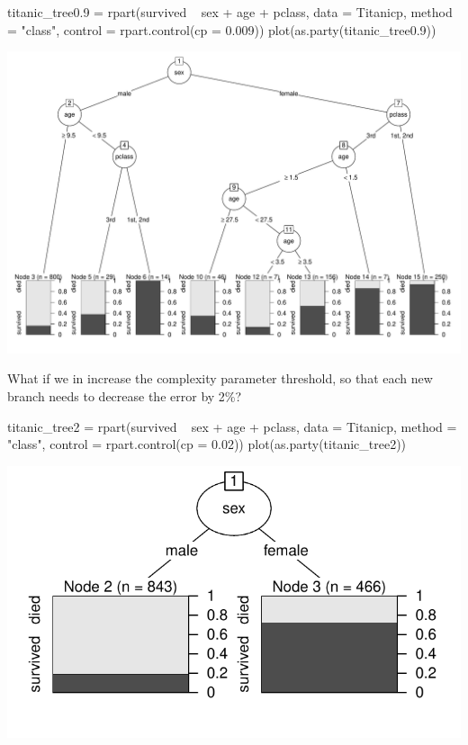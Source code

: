 \documentclass[a4paper]{article}\usepackage[]{graphicx}\usepackage[]{xcolor}
\begin{document}
\begin{Schunk}
\begin{Sinput}
titanic_tree0.9 = rpart(survived ~ sex + age + pclass, data = Titanicp, method = "class", 
                      control = rpart.control(cp = 0.009))
plot(as.party(titanic_tree0.9))
\end{Sinput}


{\centering \includegraphics[width=0.95\linewidth]{figure/listings-unnamed-chunk-438-1} 

}

\end{Schunk}
What if we in increase the complexity parameter threshold, so that each new branch needs to decrease the error by 2\%?
\begin{Schunk}
\begin{Sinput}
titanic_tree2 = rpart(survived ~ sex + age + pclass, data = Titanicp, method = "class", 
                      control = rpart.control(cp = 0.02))
plot(as.party(titanic_tree2))
\end{Sinput}


{\centering \includegraphics[width=0.7\linewidth]{figure/listings-unnamed-chunk-439-1} 

}

\end{Schunk}
\end{document}
